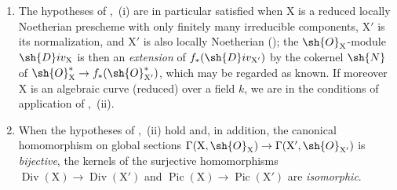 \begin{remark}[21.8.6]
\label{IV.21.8.6}
\begin{enumerate}[label=(\roman*)]
  \item The hypotheses of ,{}~(i) are in particular satisfied when $\mathrm{X}$ is a reduced locally Noetherian prescheme with only finitely many irreducible components, $\mathrm{X}'$ is its normalization, and $\mathrm{X}'$ is also locally Noetherian ();
the $\sh{O}_\mathrm{X}$-module $\sh{D}iv_\mathrm{X}$ is then an \emph{extension} of $f_*(\sh{D}iv_{\mathrm{X}'})$ by the cokernel $\sh{N}$ of $\sh{O}^{*}_\mathrm{X}\to f_*(\sh{O}^*_{\mathrm{X}'})$, which may be regarded as known.
If moreover $\mathrm{X}$ is an algebraic curve (reduced) over a field $k$, we are in the conditions of application of ,{}~(ii).

  \item When the hypotheses of ,{}~(ii) hold and, in addition, the canonical homomorphism on global sections $\Gamma(\mathrm{X},\sh{O}_\mathrm{X})\to\Gamma(\mathrm{X}',\sh{O}_{\mathrm{X}'})$ is \emph{bijective}, the kernels of the surjective homomorphisms $\operatorname{Div}(\mathrm{X})\to\operatorname{Div}(\mathrm{X}')$ and $\operatorname{Pic}(\mathrm{X})\to\operatorname{Pic}(\mathrm{X}')$ are \emph{isomorphic}.


\end{enumerate}
\end{remark}
